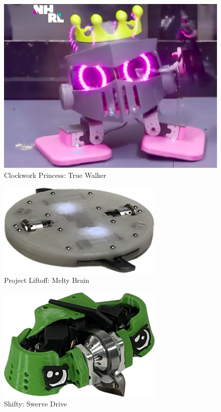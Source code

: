 \documentclass[conference]{IEEEtran}
\begin{document}
\begin{figure}[htp]
\centering
\includegraphics[scale=0.3]{clockworkprincess.png}
\caption{Clockwork Princess: True Walker \cite{b4}}
\label{Clockwork Princess: True Walker}
\end{figure}

\begin{figure}[htp]
\centering
\includegraphics[scale=0.4]{projectliftoff.png}
\caption{Project Liftoff: Melty Brain \cite{b2}}
\label{Project Liftoff: Melty Brain}
\end{figure}

\begin{figure}[htp]
\centering
\includegraphics[scale=0.4]{shifty.png}
\caption{Shifty: Swerve Drive \cite{b2}}
\label{Shifty: Swerve Drive}
\end{figure}
\end{document}
